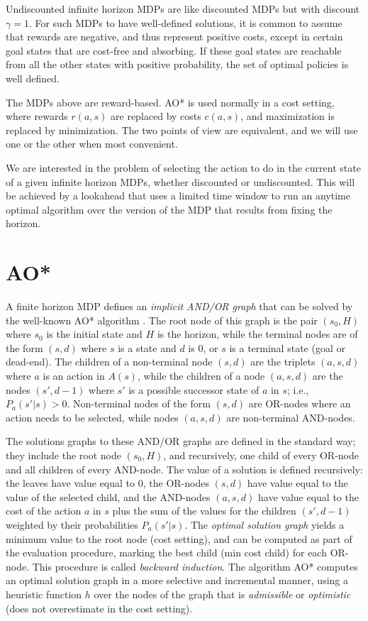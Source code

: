 \documentclass[letterpaper]{article}
\begin{document}
Undiscounted infinite horizon MDPs are like discounted MDPs but
with discount $\gamma=1$. For such MDPs to have well-defined
solutions, it is common to assume that rewards are negative, and
thus represent positive costs, except in certain goal states
that are cost-free and absorbing. If these goal states
are reachable from all the other  states  with positive
probability, the set of optimal policies is well defined.

The MDPs above are reward-based. AO* is used normally in a cost
setting, where rewards $r(a,s)$ are replaced by costs $c(a,s)$,
and maximization is replaced by minimization. The two points of
view are equivalent, and we will use one or the other
when most convenient.

We  are interested in the problem of selecting the
action to do in the current state of a given infinite horizon MDPs, whether
discounted or undiscounted. This will be achieved by a lookahead that
uses a limited time window to run an anytime optimal algorithm over the version
of the MDP that results from fixing the horizon.

\section{AO*}

A finite horizon MDP defines an \emph{implicit AND/OR graph} that can be solved
by the well-known AO* algorithm \cite{nilsson:book}. The root node of this graph
is the pair $(s_0,H)$ where $s_0$ is the initial state and $H$ is the horizon,
while the terminal nodes are of the form $(s,d)$ where $s$ is a state and
$d$ is $0$, or $s$ is a terminal state (goal or dead-end).
The children of a non-terminal node $(s,d)$ are the triplets $(a,s,d)$ where $a$
is an action in $A(s)$, while the children of a node $(a,s,d)$ are the nodes
$(s',d-1)$ where $s'$ is a possible successor state of $a$ in $s$; i.e.,
$P_a(s'|s) > 0$.
Non-terminal nodes of the form $(s,d)$ are OR-nodes where an action needs to be
selected, while nodes %
$(a,s,d)$ are non-terminal AND-nodes.

The solutions graphs to these AND/OR graphs are defined in the standard way;
they include the root node $(s_0,H)$, and recursively, one child of every
OR-node and all children of every AND-node.
The value of a solution is defined recursively: the leaves have value equal to $0$, the OR-nodes $(s,d)$ have
value equal to the value of the selected child, and the AND-nodes $(a,s,d)$
have value equal to the cost of the action $a$ in $s$ plus the sum of
the values for the children $(s',d-1)$ weighted by their probabilities $P_a(s'|s)$.
The \emph{optimal solution graph} yields a minimum value to the root node (cost setting),
and can be computed as part of the evaluation procedure, marking the best child (min cost child)
for each OR-node.  This procedure is called \emph{backward induction}.
The algorithm AO* computes an optimal solution graph in a more selective and incremental
manner, using a heuristic function $h$ over the nodes of the graph that is \emph{admissible} or
\emph{optimistic} (does not overestimate in the cost setting).
\end{document}
